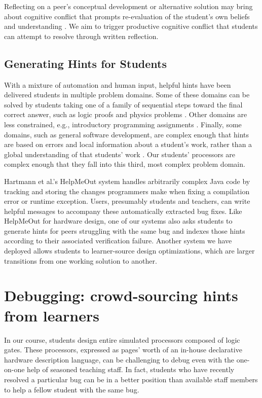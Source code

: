 \documentclass{sigchi}
\begin{document}
Reflecting on a peer's conceptual development or alternative solution may bring about cognitive conflict that prompts re-evaluation of the student's own beliefs and understanding \cite{kavanagh}. We aim to trigger productive cognitive conflict that students can attempt to resolve through written reflection.
\subsection{Generating Hints for Students}
With a mixture of automation and human input, helpful hints have been delivered students in multiple problem domains. Some of these domains can be solved by students taking one of a family of sequential steps toward the final correct answer, such as logic proofs \cite{barnes} and physics problems \cite{gertner}. Other domains are less constrained, e.g., introductory programming assignments \cite{autograder}. Finally, some domains, such as general software development, are complex enough that hints are based on errors and local information about a student's work, rather than a global understanding of that students' work \cite{helpmeout}. Our students' processors are complex enough that they fall into this third, most complex problem domain.

Hartmann et al.'s HelpMeOut \cite{helpmeout} system handles arbitrarily complex Java code by tracking and storing the changes programmers make when fixing a compilation error or runtime exception. Users, presumably students and teachers, can write helpful messages to accompany these automatically extracted bug fixes. Like HelpMeOut for hardware design, one of our systems also asks students to generate hints for peers struggling with the same bug and indexes those hints according to their associated verification failure. Another system we have deployed allows students to learner-source design optimizations, which are larger transitions from one working solution to another.

\section{Debugging: crowd-sourcing hints from learners}                                                
In our course, students design entire simulated processors composed of logic gates. These processors, expressed as pages' worth of an in-­house declarative hardware description language, can be challenging to debug even with the one­-on-­one help of seasoned teaching staff. In fact, students who have recently resolved a particular bug can be in a better position than available staff members to help a fellow student with the same bug. 
\end{document}
